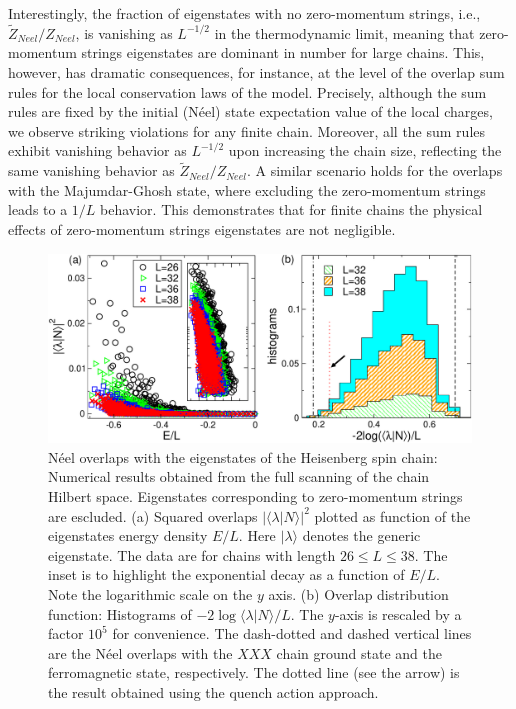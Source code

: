 \documentclass[11pt]{iopart}
\begin{document}
Interestingly, the fraction of eigenstates with no zero-momentum strings, i.e.,  
$\widetilde Z_{Neel}/Z_{Neel}$, is vanishing as $L^{-1/2}$ in the thermodynamic 
limit, meaning that zero-momentum strings eigenstates are dominant in number 
for large chains. This, however, has dramatic consequences, for instance, at the 
level of the overlap sum rules for the local conservation laws of the model. 
Precisely, although the sum rules are fixed by the initial (N\'eel) state 
expectation value of the local charges, we observe striking violations for 
any finite chain. Moreover, all the sum rules exhibit vanishing behavior as 
$L^{-1/2}$ upon increasing the chain size, reflecting the same vanishing behavior 
as $\widetilde Z_{Neel}/Z_{Neel}$. A similar scenario holds for the overlaps with 
the Majumdar-Ghosh state, where excluding the zero-momentum strings leads to a $1/L$ 
behavior. This demonstrates that for finite chains the physical effects of 
zero-momentum strings eigenstates are not negligible. 


\begin{figure}[t]
\begin{center}
\includegraphics[width=.9\textwidth]{./draft_figs/Neel_overlaps}
\end{center}
\caption{ N\'eel overlaps with the eigenstates of the Heisenberg spin 
 chain: Numerical results obtained from the full scanning of the chain 
 Hilbert space. Eigenstates corresponding to zero-momentum strings are 
 escluded. (a) Squared overlaps $|\langle\lambda|N\rangle|^2$ plotted as 
 function of the eigenstates energy density $E/L$. Here $|\lambda\rangle$ 
 denotes the generic eigenstate. The data are for chains with length $26
 \le L\le 38$. The inset is to highlight the exponential decay as a 
 function of $E/L$. Note the logarithmic scale on the $y$ axis. (b) 
 Overlap distribution function: Histograms of $-2\log\langle\lambda|N\rangle/L$. 
 The $y$-axis is rescaled by a factor $10^5$ for convenience. The dash-dotted 
 and dashed vertical lines are the N\'eel overlaps with the $XXX$ chain ground 
 state and the ferromagnetic state, respectively. The dotted line (see 
 the arrow) is the result obtained using the quench action approach. 
}
\label{fig0:neel-ov}
\end{figure}
\end{document}

